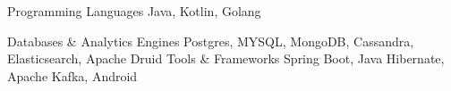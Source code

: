 

\begin{cvskills}

  \cvskill
    {Programming Languages} %
    {Java, Kotlin, Golang} %

  \cvskill
    {Databases \& Analytics Engines} %
    {Postgres, MYSQL, MongoDB, Cassandra, Elasticsearch, Apache Druid} %
  \cvskill
    {Tools \& Frameworks} %
    {Spring Boot, Java Hibernate, Apache Kafka, Android} %

\end{cvskills}
